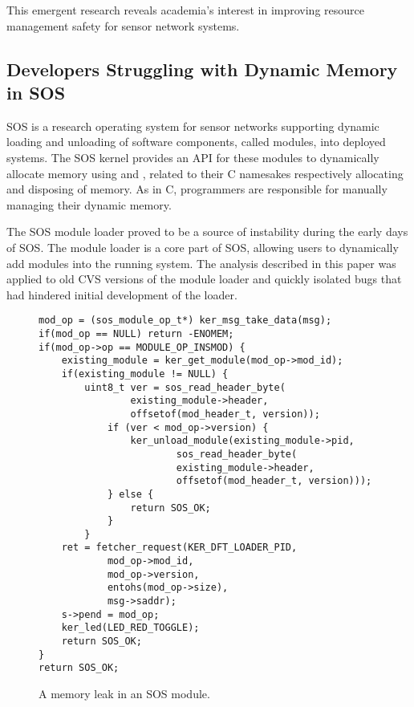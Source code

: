 This emergent research reveals academia's interest in improving resource
management safety for sensor network systems.



\subsection{Developers Struggling with Dynamic Memory in SOS}



SOS is a research operating system for sensor networks supporting dynamic
loading and unloading of software components, called modules, into deployed
systems.
%
The SOS kernel provides an API for these modules to dynamically allocate
memory using  and , related to their C
namesakes respectively allocating and disposing of memory.  
%
As in C, programmers are responsible for manually managing their dynamic
memory.  



The SOS module loader proved to be a source of instability during the early
days of SOS.
%
The module loader is a core part of SOS, allowing users to dynamically add
modules into the running system.
%
The analysis described in this paper was applied to old CVS versions of the
module loader and quickly isolated bugs that had hindered initial development
of the loader.



\begin{figure}[tp]
\begin{scriptsize}
\begin{verbatim}
mod_op = (sos_module_op_t*) ker_msg_take_data(msg);
if(mod_op == NULL) return -ENOMEM;
if(mod_op->op == MODULE_OP_INSMOD) {
    existing_module = ker_get_module(mod_op->mod_id);
    if(existing_module != NULL) {
        uint8_t ver = sos_read_header_byte(
                existing_module->header,
                offsetof(mod_header_t, version));
            if (ver < mod_op->version) {
                ker_unload_module(existing_module->pid, 
                        sos_read_header_byte(
                        existing_module->header,
                        offsetof(mod_header_t, version)));
            } else {
                return SOS_OK;
            }
        }
    ret = fetcher_request(KER_DFT_LOADER_PID,
            mod_op->mod_id,
            mod_op->version,
            entohs(mod_op->size),
            msg->saddr);
    s->pend = mod_op;
    ker_led(LED_RED_TOGGLE);
    return SOS_OK;
}
return SOS_OK;
\end{verbatim}
\end{scriptsize}
\caption{\label{fig:leak}A memory leak in an SOS module.}
\end{figure}



